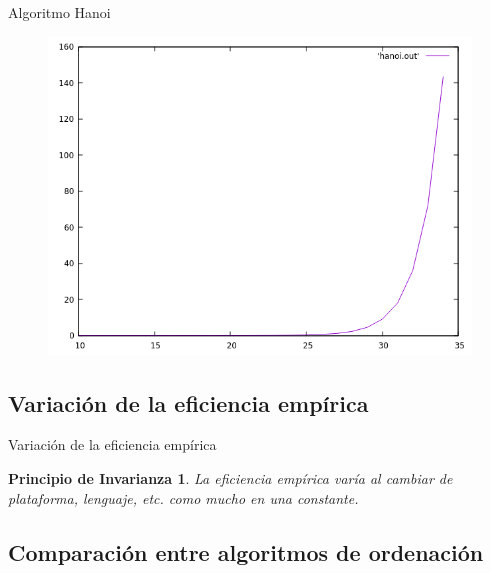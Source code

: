 \documentclass{beamer}
\newtheorem{ppio_invarianza}{Principio de Invarianza}
\begin{document}
\begin{frame}[fragile]{Algoritmo Hanoi}
\begin{figure}[H]
\centering
\includegraphics[scale=0.5]{empirica_hanoi.png}
\end{figure}
\end{frame}

\subsection{Variación de la eficiencia empírica}
\begin{frame}[fragile]{Variación de la eficiencia empírica}
\begin{ppio_invarianza}
La eficiencia empírica varía al cambiar de plataforma, lenguaje, etc. como mucho en una constante.
\end{ppio_invarianza}
\end{frame}

\subsection{Comparación entre algoritmos de ordenación}
\end{document}
